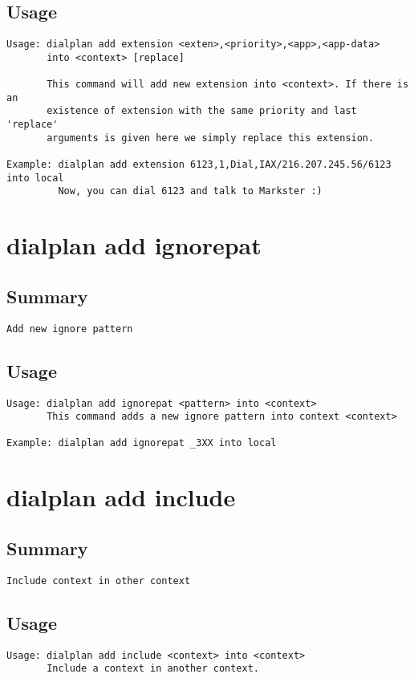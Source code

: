 \subsection{Usage}
\begin{verbatim}
Usage: dialplan add extension <exten>,<priority>,<app>,<app-data>
       into <context> [replace]

       This command will add new extension into <context>. If there is an
       existence of extension with the same priority and last 'replace'
       arguments is given here we simply replace this extension.

Example: dialplan add extension 6123,1,Dial,IAX/216.207.245.56/6123 into local
         Now, you can dial 6123 and talk to Markster :)

\end{verbatim}


\section{dialplan add ignorepat}
\subsection{Summary}
\begin{verbatim}
Add new ignore pattern
\end{verbatim}
\subsection{Usage}
\begin{verbatim}
Usage: dialplan add ignorepat <pattern> into <context>
       This command adds a new ignore pattern into context <context>

Example: dialplan add ignorepat _3XX into local

\end{verbatim}


\section{dialplan add include}
\subsection{Summary}
\begin{verbatim}
Include context in other context
\end{verbatim}
\subsection{Usage}
\begin{verbatim}
Usage: dialplan add include <context> into <context>
       Include a context in another context.

\end{verbatim}


